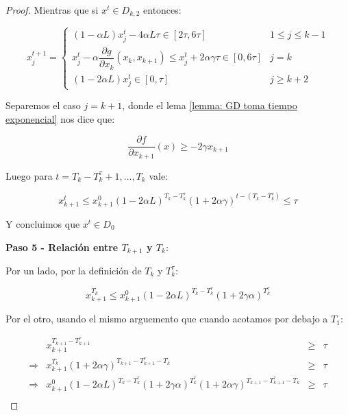 \begin{proof}
	Mientras que si $x^t \in D_{k,2}$ entonces:
	
	\begin{equation*}
	x_j^{t+1} = \left\lbrace \begin{array}{cr}
	\left(1 - \alpha L\right)x_j^t - 4\alpha L \tau \in [2\tau, 6\tau] & 1 \leq j \leq k-1 \\
	x_j^t - \alpha \dfrac{\partial g}{\partial x_k} \left(x_k, x_{k+1}\right) \leq x_j^t  + 2\alpha \gamma \tau \in [0, 6\tau] & j = k \\
	\left(1 - 2\alpha L\right)x_j^t \in [0, \tau] & j \geq k+2
	\end{array}\right.
	\end{equation*}	
	
	Separemos el caso $j= k+1$, donde el lema \ref{lemma: GD toma tiempo exponencial} nos dice que:
	
	\begin{equation*}
		\dfrac{\partial f}{\partial x_{k+1}}\left(x\right) \geq -2 \gamma x_{k+1}
	\end{equation*}
	
	Luego para $t = T_k - T_k^{\tau} + 1, \dots, T_k$ vale:
	
	\begin{equation*}
		x_{k+1}^{t} \leq x_{k+1}^0 \left(1 - 2 \alpha L\right)^{T_k - T_k^{\tau}} \left(1 + 2 \alpha \gamma \right)^{t - \left(T_k - T_k^{\tau}\right)} \leq \tau
	\end{equation*}
	
	Y concluimos que $x^t \in D_0$
	
	\medskip
	
	\textbf{Paso 5 - Relaci\'on entre $T_{k+1}$ y $T_k$}:
	
	\medskip
	
	Por un lado, por la definici\'on de $T_k$ y $T_k^{\tau}$:
	
	\begin{equation*}
		x_{k+1}^{T_k} \leq x_{k+1}^{0} \left(1 - 2 \alpha L\right)^{T_k - T_k^{\tau}}\left(1 + 2 \gamma \alpha\right)^{T_k^{\tau}}
	\end{equation*}
	
	Por el otro, usando el mismo arguemento que cuando acotamos por debajo a $T_1$:
	
	\begin{equation*}
	\begin{aligned}
		& x_{k+1}^{T_{k+1} - T_{k+1}^{\tau}} & \geq & \tau \\
		\Rightarrow & x_{k+1}^{T_k} \left(1 + 2 \alpha \gamma\right)^{T_{k+1} - T_{k+1}^{\tau} - T_k} & \geq & \tau \\
		\Rightarrow & x_{k+1}^{0} \left(1 - 2 \alpha L\right)^{T_k - T_k^{\tau}}\left(1 + 2 \gamma \alpha\right)^{T_k^{\tau}} \left(1 + 2 \alpha \gamma\right)^{T_{k+1} - T_{k+1}^{\tau} - T_k} & \geq & \tau \\
	\end{aligned}
	\end{equation*}
	

\end{proof}
